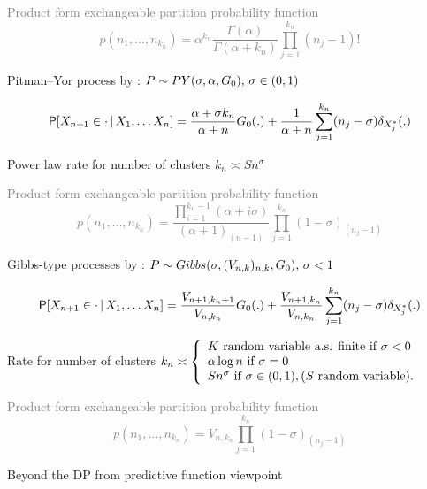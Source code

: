\textcolor{gray}{
Product form exchangeable partition probability function  
$$p(n_1,\ldots,n_{k_n})=\alpha^{k_n}\frac{\Gamma(\alpha)}{\Gamma(\alpha+k_n)}\prod_{j=1}^{k_n}(n_j-1)!$$}



\alert{Pitman--Yor process} by \citet{pitman1997two}: $P\sim PY(\sigma,\alpha, G_0),\,\sigma\in(0,1)$

$$\mathsf{P}[X_{n+1}\in \cdot\, \vert\, X_1,\ldots X_{n}]=\frac{\alpha+\sigma k_n}{\alpha+n}G_{0}(.)+\frac{1}{\alpha+n}\sum_{j=1}^{{k_n}}(n_j-\sigma)\delta_{X_{j}^*}(.)$$

\begin{center}
Power law rate for number of clusters \alert{$k_n \asymp S n^\sigma$}
\end{center}

\medskip

\textcolor{gray}{
Product form exchangeable partition probability function  
$$p(n_1,\ldots,n_{k_n})=\frac{\prod_{i=1}^{k_n-1}(\alpha+i\sigma)}{(\alpha+1)_{(n-1)}}\prod_{j=1}^{k_n}(1-\sigma)_{(n_j-1)}$$}



\alert{Gibbs-type processes} by \citet{pitman2003poisson}: $P\sim Gibbs(\sigma,(V_{n,k})_{n,k}, G_0),\,\sigma<1$

$$\mathsf{P}[X_{n+1}\in \cdot\, \vert\, X_1,\ldots X_{n}]=\frac{V_{n+1,{k_n}+1}}{V_{n,{k_n}}}G_{0}(.)+\frac{V_{n+1,{k_n}}}{V_{n,{k_n}}}\sum_{j=1}^{{k_n}}(n_j-\sigma)\delta_{X_{j}^*}(.)$$

\begin{center}
Rate for number of clusters 
$k_n \asymp
\left\{
\begin{array}{l}
K \text{ random variable a.s. finite if }\sigma<0\\
\alpha \log n  \text{  if }\sigma=0\\
S n^\sigma \text{ if }\sigma\in(0,1), (S \text{ random variable)}.
\end{array}
\right.
$
\end{center}
\medskip

\textcolor{gray}{
Product form exchangeable partition probability function  
$$p(n_1,\ldots,n_{k_n})=V_{n,{k_n}}\prod_{j=1}^{k_n}(1-\sigma)_{(n_j-1)}$$}





{Beyond the DP from predictive function viewpoint} 

